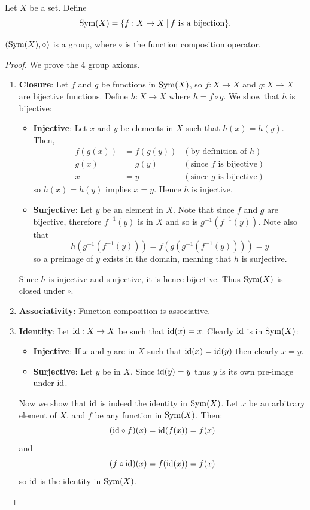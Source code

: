 \begin{definition}
    Let $X$ be a set. Define
    \[
        \Sym{X} = \{f: X \to X \vert f \text{ is a bijection}\}.
    \]
\end{definition}
\begin{proposition}
    $(\mathrm{Sym}(X), \circ)$ is a group, where $\circ$ is the function composition operator.
\end{proposition}
\begin{proof}
    We prove the 4 group axioms.
    \begin{enumerate}
        \item \textbf{Closure}: Let $f$ and $g$ be functions in $\mathrm{Sym}(X)$, so $f: X\to X$ and $g:X \to X$ are bijective functions. Define $h:X \to X$ where $h = f\circ g$. We show that $h$ is bijective:
        \begin{itemize}
            \item \textbf{Injective}: Let $x$ and $y$ be elements in $X$ such that $h(x) = h(y)$. Then,
            \begin{align*}
                f(g(x)) &= f(g(y)) & (\text{by definition of } h)\\
                g(x) &= g(y) & (\text{since } f \text{ is bijective})\\
                x &= y & (\text{since } g \text{ is bijective})
            \end{align*}
            so $h(x) = h(y)$ implies $x = y$. Hence $h$ is injective.
            \item \textbf{Surjective}: Let $y$ be an element in $X$. Note that since $f$ and $g$ are bijective, therefore $f^{-1}(y)$ is in $X$ and so is $g^{-1}(f^{-1}(y))$. Note also that
            \[
                h(g^{-1}(f^{-1}(y))) = f(g(g^{-1}(f^{-1}(y)))) = y
            \]
            so a preimage of $y$ exists in the domain, meaning that $h$ is surjective.
        \end{itemize}
        Since $h$ is injective and surjective, it is hence bijective. Thus $\mathrm{Sym}(X)$ is closed under $\circ$.
        
        \item \textbf{Associativity}: Function composition is associative.
        
        \item \textbf{Identity}: Let $\mathrm{id} : X \to X$ be such that $\mathrm{id}(x) = x$. Clearly $\mathrm{id}$ is in $\mathrm{Sym}(X)$:
        \begin{itemize}
            \item \textbf{Injective}: If $x$ and $y$ are in $X$ such that $\mathrm{id}(x) = \mathrm{id}(y)$ then clearly $x = y$.
            \item \textbf{Surjective}: Let $y$ be in $X$. Since $\mathrm{id}(y) = y$ thus $y$ is its own pre-image under $\mathrm{id}$.
        \end{itemize}
        Now we show that $\mathrm{id}$ is indeed the identity in $\mathrm{Sym}(X)$. Let $x$ be an arbitrary element of $X$, and $f$ be any function in $\mathrm{Sym}(X)$. Then:
        \[
            (\mathrm{id} \circ f)(x) = \mathrm{id}(f(x)) = f(x)
        \]
        and
        \[
            (f \circ \mathrm{id})(x) = f(\mathrm{id}(x)) = f(x)
        \]
        so $\mathrm{id}$ is the identity in $\mathrm{Sym}(X)$.
        

\end{enumerate}
\end{proof}
